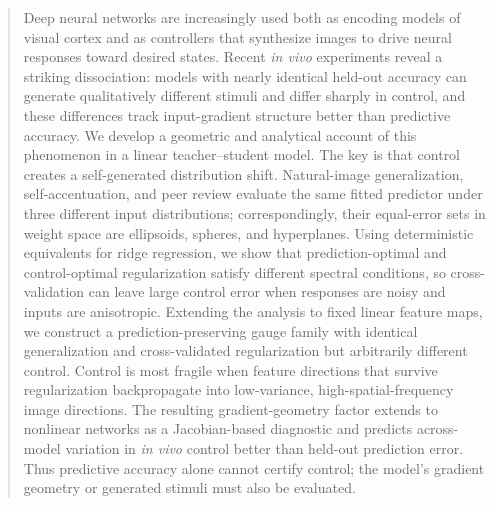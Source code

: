 %

\begin{abstract}
Deep neural networks are increasingly used both as encoding models of visual cortex and as controllers that synthesize images to drive neural responses toward desired states. Recent \textit{in vivo} experiments reveal a striking dissociation: models with nearly identical held-out accuracy can generate qualitatively different stimuli and differ sharply in control, and these differences track input-gradient structure better than predictive accuracy. We develop a geometric and analytical account of this phenomenon in a linear teacher–student model. The key is that control creates a self-generated distribution shift. Natural-image generalization, self-accentuation, and peer review evaluate the same fitted predictor under three different input distributions; correspondingly, their equal-error sets in weight space are ellipsoids, spheres, and hyperplanes.
Using deterministic equivalents for ridge regression, we show that prediction-optimal and control-optimal regularization satisfy different spectral conditions, so cross-validation can leave large control error when responses are noisy and inputs are anisotropic. Extending the analysis to fixed linear feature maps, we construct a prediction-preserving gauge family with identical generalization and cross-validated regularization but arbitrarily different control. Control is most fragile when feature directions that survive regularization backpropagate into low-variance, high-spatial-frequency image directions. The resulting gradient-geometry factor extends to nonlinear networks as a Jacobian-based diagnostic and predicts across-model variation in \textit{in vivo} control better than held-out prediction error. Thus predictive accuracy alone cannot certify control; the model’s gradient geometry or generated stimuli must also be evaluated.

\end{abstract}
